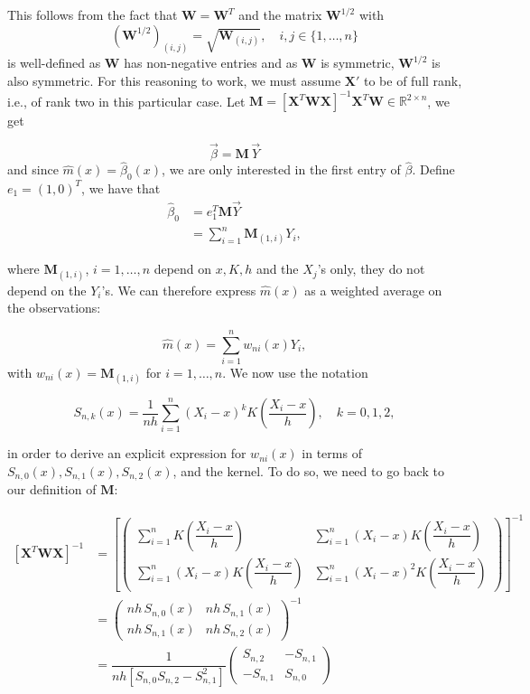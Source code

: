 \documentclass[
  letterpaper,
  DIV=11,
  numbers=noendperiod]{scrartcl}
\begin{document}
This follows from the fact that \(\textbf{W} = \textbf{W}^T\) and the
matrix \(\textbf{W}^{1/2}\) with \[
\left( \textbf{W}^{1/2} \right)_{(i, j)} = \sqrt{\textbf{W}_{(i, j)}}, \quad i, j \in \{1, \ldots, n\}
\] is well-defined as \(\textbf{W}\) has non-negative entries and as
\(\textbf{W}\) is symmetric, \(\textbf{W}^{1/2}\) is also symmetric. For
this reasoning to work, we must assume \(\textbf{X}'\) to be of full
rank, i.e., of rank two in this particular case. Let
\(\textbf{M} = \left[\textbf{X}^T \textbf{W} \textbf{X}\right]^{-1}\textbf{X}^T \textbf{W} \in \mathbb{R}^{2 \times n}\),
we get

\[
\vec{\beta} = \textbf{M} \, \vec{Y}
\] and since \(\hat{m}(x) = \hat{\beta}_0(x)\), we are only interested
in the first entry of \(\hat{\beta}\). Define \(e_1 = (1, 0)^T\), we
have that \begin{align*}
\hat{\beta}_0 &= e_1^T \textbf{M} \vec{Y} \\
&= \sum_{i=1}^n \textbf{M}_{(1, i)} Y_i,
\end{align*}

where \(\textbf{M}_{(1, i)}\), \(i= 1, \ldots, n\) depend on \(x, K, h\)
and the \(X_j\)'s only, they do not depend on the \(Y_i\)'s. We can
therefore express \(\hat{m}(x)\) as a weighted average on the
observations:

\[\hat m(x) = \sum_{i=1}^n w_{ni}(x) Y_i,\] with
\(w_{ni}(x) = \textbf{M}_{(1, i)}\) for \(i= 1, \ldots, n\). We now use
the notation

\[S_{n,k}(x) = \frac{1}{nh}\sum_{i=1}^n (X_i - x)^k K\left(\frac{X_i - x}{h}\right), \quad k=0,1,2,\]

in order to derive an explicit expression for \(w_{ni}(x)\) in terms of
\(S_{n,0}(x), S_{n,1}(x), S_{n,2}(x)\), and the kernel. To do so, we
need to go back to our definition of \(\textbf{M}\):

\begin{align*}
\left[\textbf{X}^T \textbf{W} \textbf{X}\right]^{-1} &= 
\left[\begin{pmatrix}
\sum_{i=1}^n  K\left(\dfrac{X_i-x}{h}\right) & \sum_{i=1}^n \left(X_i-x\right) K\left(\dfrac{X_i-x}{h}\right)  \\
\sum_{i=1}^n \left(X_i-x\right) K\left(\dfrac{X_i-x}{h}\right) & \sum_{i=1}^n \left(X_i-x\right)^2 K\left(\dfrac{X_i-x}{h}\right)
\end{pmatrix} \right]^{-1} \\
&= \begin{pmatrix}
nh \,S_{n, 0}(x) & nh \, S_{n, 1}(x) \\
nh \,S_{n, 1}(x) & nh \,S_{n, 2}(x)
\end{pmatrix}^{-1} \\
&= \dfrac{1}{nh[S_{n, 0}S_{n, 2}-S_{n, 1}^2]} \begin{pmatrix}
S_{n,2} & -S_{n,1} \\
-S_{n,1} & S_{n, 0}
\end{pmatrix}
\end{align*}
\end{document}
